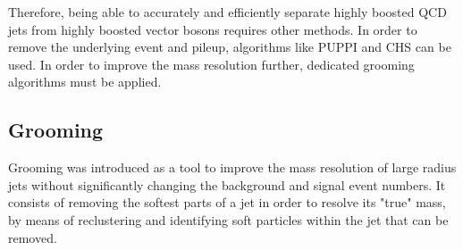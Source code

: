 Therefore, being able to accurately and efficiently separate highly boosted QCD jets from highly boosted vector bosons requires other methods. In order to remove the underlying event and pileup, algorithms like PUPPI and CHS can be used. In order to improve the mass resolution further, dedicated grooming algorithms must be applied.

\subsection{Grooming}
\label{sec:objreco:grooming}
Grooming was introduced as a tool to improve the mass resolution of large radius jets without significantly changing the background and signal event numbers. It consists of removing the softest parts of a jet in order to resolve its "true" mass, by means of reclustering and identifying soft particles within the jet that can be removed.

